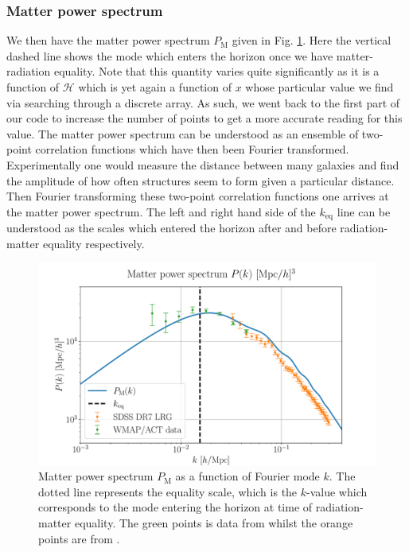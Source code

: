 \documentclass[%
reprint,
 amsmath,amssymb,
 aps,
]{revtex4-2}
\newcommand{\Hp}{\mathcal{H}}
\begin{document}
\subsubsection{Matter power spectrum}
We then have the matter power spectrum $P_\text{M}$ given in Fig. \ref{fig:Mat_pow}. Here the vertical dashed line shows the mode which enters the horizon once we have matter-radiation equality. Note that this quantity varies quite significantly as it is a function of $\Hp$ which is yet again a function of $x$ whose particular value we find via searching through a discrete array. As such, we went back to the first part of our code to increase the number of points to get a more accurate reading for this value. The matter power spectrum can be understood as an ensemble of two-point correlation functions which have then been Fourier transformed. Experimentally one would measure the distance between many galaxies and find the amplitude of how often structures seem to form given a particular distance. Then Fourier transforming these two-point correlation functions one arrives at the matter power spectrum. The left and right hand side of the $k_\text{eq}$ line can be understood as the scales which entered the horizon after and before radiation-matter equality respectively. 
\begin{figure}[ht!]
	\includegraphics[width = \linewidth]{Figures/Mat_pow.pdf}
	\caption{Matter power spectrum $P_\text{M}$ as a function of Fourier mode $k$. The dotted line represents the equality scale, which is the $k$-value which corresponds to the mode entering the horizon at time of radiation-matter equality. The green points is data from \cite{Hlozek_2012} whilst the orange points are from \cite{Reid_2010}.}
	\label{fig:Mat_pow}
\end{figure}
\end{document}

